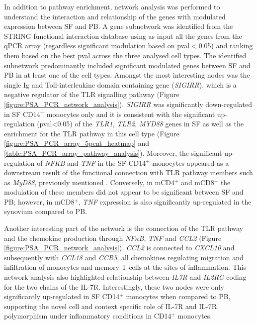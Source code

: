 In addition to pathway enrichment, network analysis was performed to understand the interaction and relationship of the genes with modulated expression between SF and PB. A gene subnetwork was identified from the STRING functional interaction database using as input all the genes from the qPCR array (regardless significant modulation based on pval$<$0.05) and ranking them based on the best pval across the three analysed cell types. The identified subnetwork predominantly included significant modulated genes between SF and PB in at least one of the cell types. Amongst the most interesting nodes was the single Ig and Toll-interleukine domain containing gene (\textit{SIGIRR}), which is a negative regulator of the TLR signalling pathway (Figure \ref{figure:PSA_PCR_network_analysis}). \textit{SIGIRR} was significantly down-regulated in SF CD14$^+$ monocytes only and it is consistent with the significant up-regulation (pval<0.05) of the \textit{TLR1}, \textit{TLR2}, \textit{MYD88} genes in SF as well as the enrichment for the TLR pathway in this cell type (Figure \ref{figure:PSA_PCR_array_5pcnt_heatmap} and \ref{table:PSA_PCR_array_pathway_analysis}). Moreover, the significant up-regulation of \textit{NFKB} and \textit{TNF} in the SF CD14$^+$ monocytes appeared as a downstream result of the functional connection with TLR pathway members such as \textit{MyD88}, previously mentioned . Conversely, in mCD4$^+$ and mCD8$^+$ the modulation of these members did not appear to be significant between SF and PB; however, in mCD8$^+$, \textit{TNF} expression is also significantly up-regulated in the synovium compared to PB. 

Another interesting part of the network is the connection of the TLR pathway and the chemokine production through \textit{NF$\kappa$B}, \textit{TNF} and \textit{CCL2} (Figure \ref{figure:PSA_PCR_network_analysis}). \textit{CCL2} is connected to \textit{CXCL10} and subsequently with \textit{CCL18} and \textit{CCR5}, all chemokines regulating migration and infiltration of monocytes and memory T cells at the sites of inflammation. This network analysis also highlighted relationship between \textit{IL7R} and \textit{IL2RG} coding for the two chains of the IL-7R. Interestingly, these two nodes were only significantly up-regulated in SF CD14$^+$ monocytes when compared to PB, supporting the novel cell and context specific role of IL-7R and IL-7R polymorphism under inflammatory conditions in CD14$^+$ monocytes\parencite{Al-Mossawi2018}.


